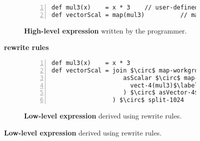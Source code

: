 \begin{figure}[t]
\centering

\begin{subfigure}[b]{.85\linewidth}
\begin{lstlisting}[mathescape,numbers=left]
def mul3(x)    = x * 3    // user-defined function
def vectorScal = map(mul3)          // map pattern
\end{lstlisting}
\caption{\textbf{High-level expression} written by the programmer.}
\label{fig:codeex:map}
\end{subfigure}

\begin{minipage}{0.1\linewidth}
\vspace{0pt}
\centering
{}
\end{minipage}
\begin{minipage}{0.25\linewidth}
\vspace{-5pt}
\centering
\textbf{rewrite rules}
\end{minipage}
\begin{minipage}{0.1\linewidth}
\vspace{0pt}
\centering
{}
\end{minipage}

\begin{subfigure}[b]{\linewidth}
\centering
\begin{minipage}{.85\linewidth}%
\begin{lstlisting}[mathescape,numbers=left]
def mul3(x)    = x * 3
def vectorScal = join $\circ$ map-workgroup($\label{fig:codeex:impl:map-wg}$
                    asScalar $\circ$ map-local($\label{fig:codeex:impl:map-wg:start}$
                      vect-4(mul3)$\label{fig:codeex:impl:vec}$
                    ) $\circ$ asVector-4$\label{fig:codeex:impl:map-wg:stop}$$\label{fig:codeex:impl:asVec}$
                 ) $\circ$ split-1024
\end{lstlisting}
\end{minipage}
\caption{\textbf{Low-level expression} derived using rewrite rules.}
\label{fig:codeex:impl}
\end{subfigure}


\end{figure}
